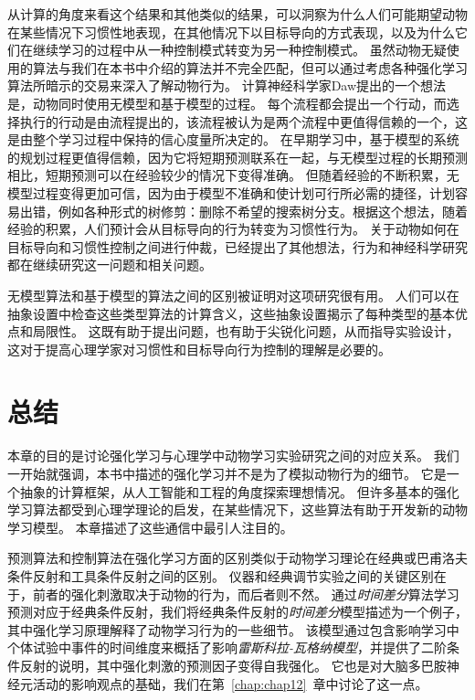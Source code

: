 {{{从计算的角度来看这个结果和其他类似的结果，可以洞察为什么人们可能期望动物在某些情况下习惯性地表现，在其他情况下以目标导向的方式表现，以及为什么它们在继续学习的过程中从一种控制模式转变为另一种控制模式。
虽然动物无疑使用的算法与我们在本书中介绍的算法并不完全匹配，但可以通过考虑各种强化学习算法所暗示的交易来深入了解动物行为。
计算神经科学家Daw\cite{daw2005uncertainty}提出的一个想法是，动物同时使用无模型和基于模型的过程。
每个流程都会提出一个行动，而选择执行的行动是由流程提出的，该流程被认为是两个流程中更值得信赖的一个，这是由整个学习过程中保持的信心度量所决定的。
在早期学习中，基于模型的系统的规划过程更值得信赖，因为它将短期预测联系在一起，与无模型过程的长期预测相比，短期预测可以在经验较少的情况下变得准确。
但随着经验的不断积累，无模型过程变得更加可信，因为由于模型不准确和使计划可行所必需的捷径，计划容易出错，例如各种形式的树修剪：删除不希望的搜索树分支。根据这个想法，随着经验的积累，人们预计会从目标导向的行为转变为习惯性行为。
关于动物如何在目标导向和习惯性控制之间进行仲裁，已经提出了其他想法，行为和神经科学研究都在继续研究这一问题和相关问题。


无模型算法和基于模型的算法之间的区别被证明对这项研究很有用。
人们可以在抽象设置中检查这些类型算法的计算含义，这些抽象设置揭示了每种类型的基本优点和局限性。
这既有助于提出问题，也有助于尖锐化问题，从而指导实验设计，这对于提高心理学家对习惯性和目标导向行为控制的理解是必要的。


\section{总结}

本章的目的是讨论强化学习与心理学中动物学习实验研究之间的对应关系。
我们一开始就强调，本书中描述的强化学习并不是为了模拟动物行为的细节。
它是一个抽象的计算框架，从人工智能和工程的角度探索理想情况。
但许多基本的强化学习算法都受到心理学理论的启发，在某些情况下，这些算法有助于开发新的动物学习模型。
本章描述了这些通信中最引人注目的。


预测算法和控制算法在强化学习方面的区别类似于动物学习理论在经典或巴甫洛夫条件反射和工具条件反射之间的区别。
仪器和经典调节实验之间的关键区别在于，前者的强化刺激取决于动物的行为，而后者则不然。
通过\textit{时间差分}算法学习预测对应于经典条件反射，我们将经典条件反射的\textit{时间差分}模型描述为一个例子，其中强化学习原理解释了动物学习行为的一些细节。
该模型通过包含影响学习中个体试验中事件的时间维度来概括了影响\textit{雷斯科拉-瓦格纳模型}，并提供了二阶条件反射的说明，其中强化刺激的预测因子变得自我强化。
它也是对大脑多巴胺神经元活动的影响观点的基础，我们在第~\ref{chap:chap12}~章中讨论了这一点。


}}}
